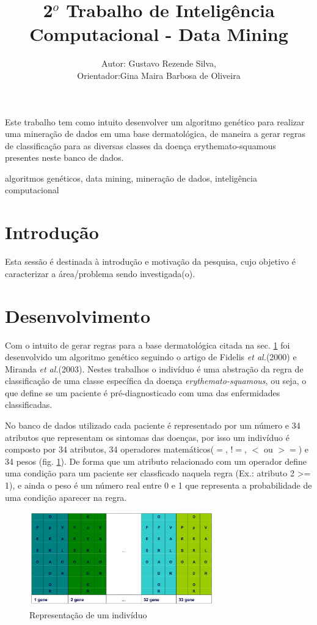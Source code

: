 \documentclass[11pt]{article}
\title{2$^o$ Trabalho de Inteligência Computacional - Data Mining}
\author{Autor: Gustavo Rezende Silva,\\ Orientador:Gina Maira Barbosa
de Oliveira}
\begin{document}
\maketitle


\begin{resumo}
Este trabalho tem como intuito desenvolver um algoritmo genético para realizar
uma mineração de dados em uma base dermatológica, de maneira a gerar regras de
classificação para as diversas classes da doença erythemato-squamous presentes
neste banco de dados.
\end{resumo}

\begin{palavraschave}
algoritmos genéticos, data mining, mineração de dados, inteligência computacional
\end{palavraschave}

\section{Introdução}
\label{sec:intro}

Esta sessão é destinada à introdução e motivação da pesquisa, cujo objetivo é caracterizar a área/problema sendo investigada(o).

\section{Desenvolvimento}
\label{sec:desen}

Com o intuito de gerar regras para a base dermatológica citada na sec.
\ref{sec:intro} foi desenvolvido um algoritmo genético seguindo o artigo de
Fidelis \textit{et al.}(2000) e Miranda \textit{et al.}(2003). Nestes trabalhos o indivíduo é uma
abstração da regra de classificação de uma classe específica da doença
\textit{erythemato-squamous}, ou seja, o que define se um paciente é
pré-diagnosticado com uma das enfermidades classificadas.

No banco de dados utilizado cada paciente é representado por um número e 34
atributos que representam os sintomas das doenças, por isso um indivíduo é
composto por 34 atributos, 34 operadores matemáticos($=$, $!=$, $<$ ou $>=$) e
34 pesos (fig. \ref{fig:individuo}). De forma que um atributo relacionado com um
operador define uma condição para um paciente ser classficado naquela regra
(Ex.: atributo 2 >= 1), e ainda o peso é um número real entre 0 e 1 que
representa a probabilidade de uma condição aparecer na regra.

\begin{figure}
  \centering
  \includegraphics[width=8cm]{individuo.png}
  \caption{Representação de um indivíduo}
  \label{fig:individuo}
\end{figure}
\end{document}
